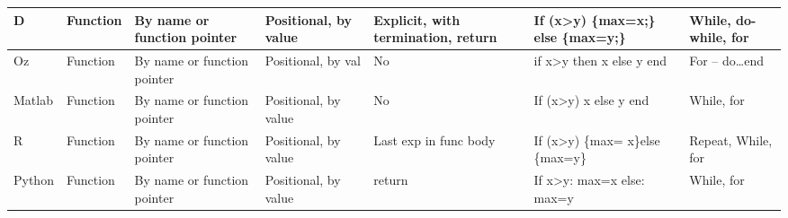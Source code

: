 \documentclass{sig-alternate}
\begin{document}
\begin{table*}[H]
\begin{tabular}{|l|l|l|l|l|l|l|}
D                  & Function                    & By name or function pointer & Positional, by value                  & Explicit, with termination, return                 & If (x\textgreater{}y) \{max=x;\} else \{max=y;\}     & While, do-while, for          \\ \hline
Oz                 & Function                    & By name or function pointer & Positional, by val                    & No                                                 & if x\textgreater{}y then x else y end                & For – do…end                  \\ \hline
Matlab             & Function                    & By name or function pointer & Positional, by value                  & No                                                 & If (x\textgreater{}y) x else y end                   & While, for                    \\ \hline
R                  & Function                    & By name or function pointer & Positional, by value                  & Last exp in func body                              & If (x\textgreater{}y) \{max= x\}else \{max=y\}       & Repeat, While, for            \\ \hline
Python             & Function                    & By name or function pointer & Positional, by value                  & return                                             & If x\textgreater{}y: max=x else: max=y               & While, for                    \\ \hline
\end{tabular}
\end{table*}
\end{document}
